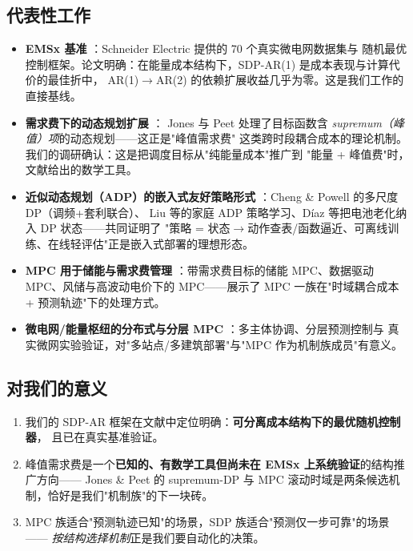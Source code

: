 \documentclass[10pt, twocolumn]{article}
\begin{document}
\subsection{代表性工作}
\begin{itemize}
\item \textbf{EMSx 基准} \cite{emsx}：Schneider Electric 提供的 70 个真实微电网数据集与
随机最优控制框架。论文明确：在能量成本结构下，SDP-AR(1) 是成本表现与计算代价的最佳折中，
AR(1)$\rightarrow$AR(2) 的依赖扩展收益几乎为零。这是我们工作的直接基线。
\item \textbf{需求费下的动态规划扩展} \cite{jones_demand_charge_dp, jones_supremum_dp}：
Jones 与 Peet 处理了目标函数含 \emph{supremum（峰值）项}的动态规划——这正是"峰值需求费"
这类跨时段耦合成本的理论机制。我们的调研确认：这是把调度目标从"纯能量成本"推广到
"能量 + 峰值费"时，文献给出的数学工具。
\item \textbf{近似动态规划（ADP）的嵌入式友好策略形式} \cite{cheng_multi_scale_dp,
liu_stochastic_hems_adp, diaz_dp_aging}：Cheng \& Powell 的多尺度 DP（调频+套利联合）、
Liu 等的家庭 ADP 策略学习、D\'iaz 等把电池老化纳入 DP 状态——共同证明了
"策略 = 状态$\rightarrow$动作查表/函数逼近、可离线训练、在线轻评估"正是嵌入式部署的理想形态。
\item \textbf{MPC 用于储能与需求费管理} \cite{raoufat_bess_demand_charge,
cortes_economic_mpc_demand, lipka_datadriven_mpc_battery, khatamianfar_mpc_wind,
jovanovic_mpc_residential}：带需求费目标的储能 MPC、数据驱动 MPC、风储与高波动电价下的
MPC——展示了 MPC 一族在"时域耦合成本 + 预测轨迹"下的处理方式。
\item \textbf{微电网/能量枢纽的分布式与分层 MPC} \cite{dao_hierarchical_mpc_microgrid,
lefebure_distributed_mpc_energyhubs, parisio_microgrid_mpc}：多主体协调、分层预测控制与
真实微网实验验证，对"多站点/多建筑部署"与"MPC 作为机制族成员"有意义。
\end{itemize}

\subsection{对我们的意义}
\begin{enumerate}
\item 我们的 SDP-AR 框架在文献中定位明确：\textbf{可分离成本结构下的最优随机控制器}，
且已在真实基准验证。
\item 峰值需求费是一个\textbf{已知的、有数学工具但尚未在 EMSx 上系统验证}的结构推广方向——
Jones \& Peet 的 supremum-DP 与 MPC 滚动时域是两条候选机制，恰好是我们"机制族"的下一块砖。
\item MPC 族适合"预测轨迹已知"的场景，SDP 族适合"预测仅一步可靠"的场景——
\emph{按结构选择机制}正是我们要自动化的决策。
\end{enumerate}
\end{document}
